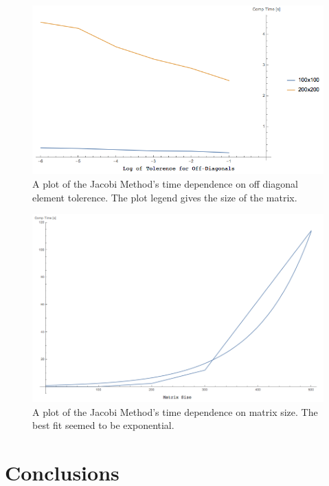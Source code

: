 \documentclass[twocolumn, groupedaddress]{revtex4-1}
\begin{document}
	
\begin{figure}[t]
	\centering
	\includegraphics[width=.75\linewidth]{jacobiTimeDependence1}
	\caption{\label{fig:jacobiTimeDependence1} A plot of the Jacobi Method's time dependence on off diagonal element tolerence.  The plot legend gives the size of the matrix.}
\end{figure}


\begin{figure}[t]
	\centering
	\includegraphics[width=.75\linewidth]{jacobiTimeDependence2}
	\caption{\label{fig:jacobiTimeDependence1} A plot of the Jacobi Method's time dependence on matrix size.  The best fit seemed to be exponential.}
\end{figure}

\section{Conclusions}


\end{document}
